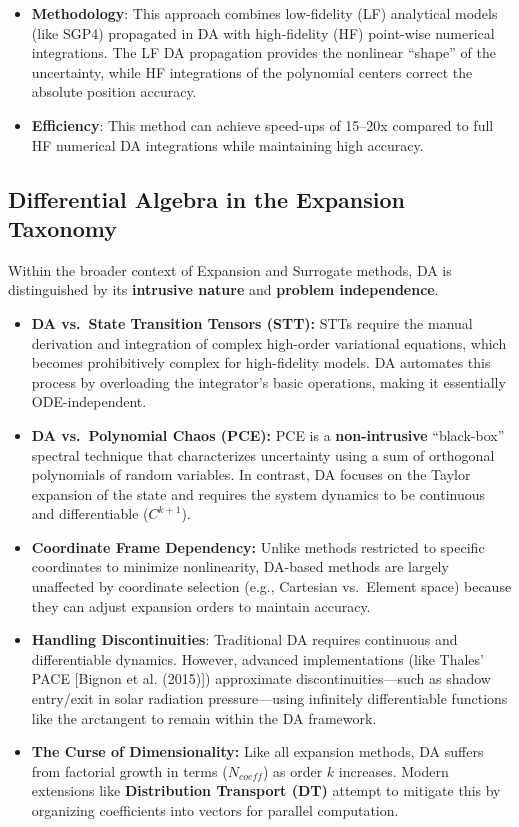 \documentclass[
  letterpaper,
  DIV=11,
  numbers=noendperiod,
  oneside]{scrartcl}
\begin{document}
\begin{itemize}
  \begin{itemize}
  \item
    \textbf{Methodology}: This approach combines low-fidelity (LF)
    analytical models (like SGP4) propagated in DA with high-fidelity
    (HF) point-wise numerical integrations. The LF DA propagation
    provides the nonlinear ``shape'' of the uncertainty, while HF
    integrations of the polynomial centers correct the absolute position
    accuracy.
  \item
    \textbf{Efficiency}: This method can achieve speed-ups of 15--20x
    compared to full HF numerical DA integrations while maintaining high
    accuracy.
  \end{itemize}
\end{itemize}

\subsection{Differential Algebra in the Expansion
Taxonomy}\label{differential-algebra-in-the-expansion-taxonomy}

Within the broader context of Expansion and Surrogate methods, DA is
distinguished by its \textbf{intrusive nature} and \textbf{problem
independence}.

\begin{itemize}
\item
  \textbf{DA vs.~State Transition Tensors (STT):} STTs require the
  manual derivation and integration of complex high-order variational
  equations, which becomes prohibitively complex for high-fidelity
  models. DA automates this process by overloading the integrator's
  basic operations, making it essentially ODE-independent.
\item
  \textbf{DA vs.~Polynomial Chaos (PCE):} PCE is a
  \textbf{non-intrusive} ``black-box'' spectral technique that
  characterizes uncertainty using a sum of orthogonal polynomials of
  random variables. In contrast, DA focuses on the Taylor expansion of
  the state and requires the system dynamics to be continuous and
  differentiable (\(C^{k+1}\)).
\item
  \textbf{Coordinate Frame Dependency:} Unlike methods restricted to
  specific coordinates to minimize nonlinearity, DA-based methods are
  largely unaffected by coordinate selection (e.g., Cartesian
  vs.~Element space) because they can adjust expansion orders to
  maintain accuracy.
\item
  \textbf{Handling Discontinuities}: Traditional DA requires continuous
  and differentiable dynamics. However, advanced implementations (like
  Thales' PACE {[}Bignon et al. (2015){]}) approximate
  discontinuities---such as shadow entry/exit in solar radiation
  pressure---using infinitely differentiable functions like the
  arctangent to remain within the DA framework.
\item
  \textbf{The Curse of Dimensionality:} Like all expansion methods, DA
  suffers from factorial growth in terms (\(N_{coeff}\)) as order \(k\)
  increases. Modern extensions like \textbf{Distribution Transport (DT)}
  attempt to mitigate this by organizing coefficients into vectors for
  parallel computation.
\end{itemize}
\end{document}
